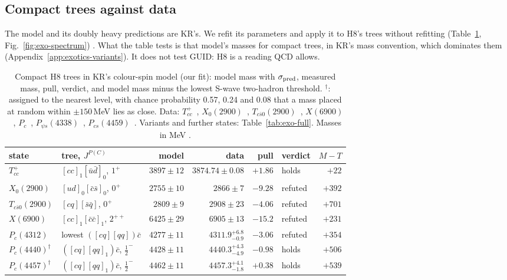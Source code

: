 \subsection{Compact trees against data}\label{sec:exotics-compact}

The model and its doubly heavy predictions are KR's. We refit its parameters and apply it to H8's trees without refitting
(Table~\ref{tab:exo-a}, Fig.~\ref{fig:exo-spectrum}) . What the table tests is that model's masses for compact trees, in
KR's mass convention, which dominates them (Appendix~\ref{app:exotics-variants}). It does not test GUID: H8 is a reading QCD allows.

\begin{table}[tbp]\centering\footnotesize\setlength{\tabcolsep}{4pt}
\caption{Compact H8 trees in KR's colour-spin model (our fit): model mass with $\sigma_{\rm pred}$, measured mass, pull, verdict, and model
mass minus the lowest S-wave two-hadron threshold. $^\dagger$: assigned to the nearest level, with chance probability 0.57, 0.24 and 0.08
that a mass placed at random within $\pm150$\,MeV lies as close. Data: $T_{cc}^+$~\cite{lhcb2022i}, $X_0(2900)$~\cite{lhcb2020i},
$T_{c\bar s0}(2900)$~\cite{lhcb2023h}, $X(6900)$~\cite{lhcb2020h}, $P_c$~\cite{lhcb2019h}, $P_{\psi s}(4338)$~\cite{lhcb2023j},
$P_{cs}(4459)$~\cite{lhcb2021h}. Variants and further states: Table~\ref{tab:exo-full}. Masses in MeV .}
\label{tab:exo-a}
\begin{tabular}{@{}llrrrlr@{}}
\toprule
state & tree, $J^{P(C)}$ & model & data & pull & verdict & $M-T$ \\
\midrule
$T_{cc}^+$ & $[cc]_1[\bar u\bar d]_0$, $1^+$ & $3897\pm12$ & $3874.74\pm0.08$ & $+1.86$ & holds & $+22$ \\
$X_0(2900)$ & $[ud]_0[\bar c\bar s]_0$, $0^+$ & $2755\pm10$ & $2866\pm7$ & $-9.28$ & refuted & $+392$ \\
$T_{c\bar s0}(2900)$ & $[cq][\bar s\bar q]$, $0^+$ & $2809\pm9$ & $2908\pm23$ & $-4.06$ & refuted & $+701$ \\
$X(6900)$ & $[cc]_1[\bar c\bar c]_1$, $2^{++}$ & $6425\pm29$ & $6905\pm13$ & $-15.2$ & refuted & $+231$ \\
$P_c(4312)$ & lowest $([cq][qq])\bar c$ & $4277\pm11$ & $4311.9^{+6.8}_{-0.9}$ & $-3.06$ & refuted & $+354$ \\
$P_c(4440)^\dagger$ & $([cq][qq]_1)\bar c$, $\frac12^-$ & $4428\pm11$ & $4440.3^{+4.3}_{-4.9}$ & $-0.98$ & holds & $+506$ \\
$P_c(4457)^\dagger$ & $([cq][qq]_1)\bar c$, $\frac12^-$ & $4462\pm11$ & $4457.3^{+4.1}_{-1.8}$ & $+0.38$ & holds & $+539$ \\

\end{tabular}
\end{table}
